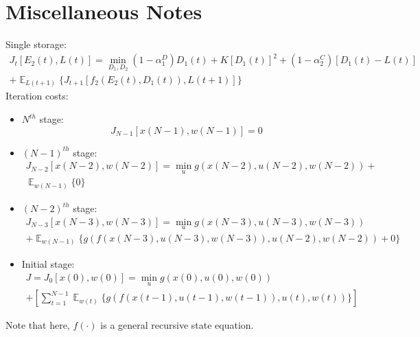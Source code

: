 \documentclass{article}
\DeclareMathOperator{\E}{\mathbb{E}}
\begin{document}
	\section{Miscellaneous Notes}
	Single storage:
	\begin{multline}
	J_{t}[E_{2}(t),L(t)] = \min_{D_{1},D_{2}}
	(1-\alpha_{1}^{D})D_{1}(t) 
	+ K[D_{1}(t)]^{2}
	+(1-\alpha_{2}^{C})[D_{1}(t)-L(t)]\\
	+\mathop{\E}_{L(t+1)} \{J_{t+1}[f_{2}(E_{2}(t),D_{1}(t)),L(t+1)]\}
	\end{multline}
	Iteration costs:
	\begin{itemize}
		\item $N^{th}$ stage: \\
		\begin{equation}
		J_{N-1}[x(N-1),w(N-1)]=0
		\end{equation}
		
		\item $(N-1)^{th}$ stage: \\
		\begin{multline}
		J_{N-2}[x(N-2),w(N-2)]=\min_{u} g(x(N-2),u(N-2),w(N-2))+\\ \mathop{\E}_{w(N-1)}\{0\}
		\end{multline}
		
		\item $(N-2)^{th}$ stage: \\
		\begin{multline}
		J_{N-3}[x(N-3),w(N-3)]=\min_{u} g(x(N-3),u(N-3),w(N-3))\\
		+ \mathop{\E}_{w(N-1)} \{
		g( f(x(N-3),u(N-3),w(N-3)) ,u(N-2),w(N-2)) + 0\}
		\end{multline}
		
		\item Initial stage: \\	
		\begin{multline}
		J=J_{0}[x(0),w(0)]=\min_{u} g(x(0),u(0),w(0))\\
		+\left[\sum_{t=1}^{N-1}\mathop{\E}_{w(t)} \{
		g( f(x(t-1),u(t-1),w(t-1)) ,u(t),w(t))
		\}\right]
		\end{multline}
	\end{itemize}
	
	Note that here, $f(\cdot)$ is a general recursive state equation.
	
	
	
\end{document}
